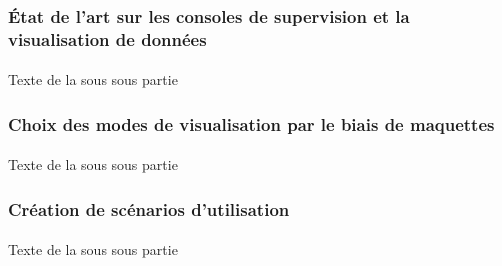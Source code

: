 		\subsubsection{État de l'art sur les consoles de supervision et la visualisation de données}
			\paragraph{}
			Texte de la sous sous partie
		\subsubsection{Choix des modes de visualisation par le biais de maquettes}
			\paragraph{}
			Texte de la sous sous partie
		\subsubsection{Création de scénarios d'utilisation}
			\paragraph{}
			Texte de la sous sous partie
